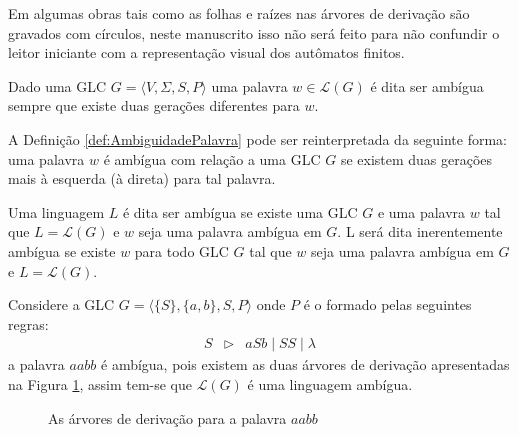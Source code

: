 \begin{note}
	Em algumas obras tais como \cite{benjaLivro2010} as folhas e raízes nas árvores de derivação são gravados com círculos, neste manuscrito isso não será feito para não confundir o leitor iniciante com a representação visual dos autômatos finitos.
\end{note}

\begin{definition}[Ambiguidade]\label{def:AmbiguidadePalavra}
	Dado uma GLC $G = \langle V, \Sigma, S, P\rangle$ uma palavra $w \in \mathcal{L}(G)$ é dita ser ambígua sempre que existe duas gerações diferentes para $w$.
\end{definition}

A Definição \ref{def:AmbiguidadePalavra} pode ser reinterpretada da seguinte forma: uma palavra $w$ é ambígua com relação a uma GLC $G$ se existem duas gerações mais à esquerda (à direta) para tal palavra.

\begin{definition}\label{def:LinguagemAmbiguidade}
	Uma linguagem $L$ é dita ser ambígua se existe uma GLC $G$ e uma palavra $w$ tal que $L = \mathcal{L}(G)$ e $w$ seja uma palavra ambígua em $G$. L será dita inerentemente ambígua se existe $w$ para todo GLC $G$ tal que  $w$ seja uma palavra ambígua em $G$ e $L = \mathcal{L}(G)$.
\end{definition}

\begin{example}
	Considere a GLC $G = \langle \{S\}, \{a, b\}, S, P \rangle$ onde $P$ é o formado pelas seguintes regras:
	\begin{eqnarray*}
		S & \rhd & aSb \mid SS \mid \lambda
	\end{eqnarray*}
	a palavra $aabb$ é ambígua, pois existem as duas árvores de derivação apresentadas na Figura \ref{fig:ArvoresAmbuigas}, assim tem-se que $\mathcal{L}(G)$ é uma linguagem ambígua.
	
	\begin{figure}[h]
		\centering
		\hfill
		\caption{As árvores de derivação para a palavra $aabb$}
		\label{fig:ArvoresAmbuigas}
	\end{figure}
\end{example}


